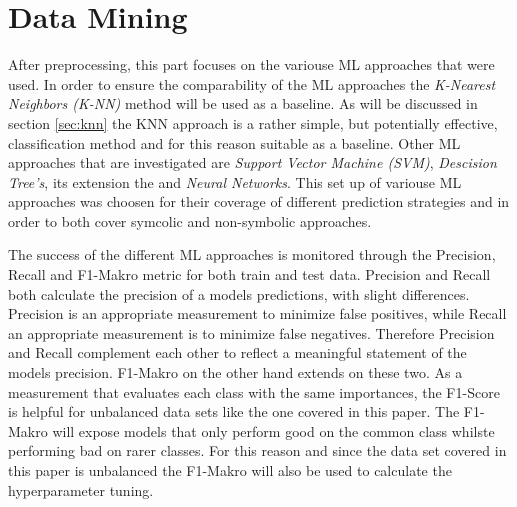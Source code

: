 \chapter{Data Mining}





After preprocessing, this part focuses on the variouse ML approaches that were used. In order to ensure the comparability of the ML approaches the \textit{K-Nearest Neighbors (K-NN)} method will be used as a baseline. As will be discussed in section \ref{sec:knn} the KNN approach is a rather simple, but potentially effective, classification method and for this reason suitable as a baseline. Other ML approaches that are investigated are \textit{Support Vector Machine (SVM)}, \textit{Descision Tree's}, its extension the  and \textit{Neural Networks}. This set up of variouse ML approaches was choosen for their coverage of different prediction strategies and in order to both cover symcolic and non-symbolic approaches.

The success of the different ML approaches is monitored through the Precision, Recall and F1-Makro metric for both train and test data. 
Precision and Recall both calculate the precision of a models predictions, with slight differences. Precision is an appropriate measurement to minimize false positives, while Recall an appropriate measurement is to minimize false negatives. Therefore Precision and Recall complement each other to reflect a meaningful statement of the models precision.\cite{Brownlee2020} F1-Makro on the other hand extends on these two. As a measurement that evaluates each class with the same importances, the F1-Score is helpful for unbalanced data sets like the one covered in this paper. The F1-Makro will expose models that only perform good on the common class whilste performing bad on rarer classes. For this reason and since the data set covered in this paper is unbalanced the F1-Makro will also be used to calculate the hyperparameter tuning.\cite{Peltarion2021}

